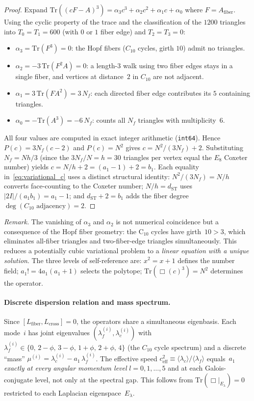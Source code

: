 \documentclass[12pt,a4paper]{article}
\theoremstyle{definition}
\begin{document}
\begin{proof}
Expand $\mathrm{Tr}((cF - A)^3) = \alpha_3 c^3 + \alpha_2 c^2 + \alpha_1 c + \alpha_0$ where $F = A_{\mathrm{fiber}}$.  Using the cyclic property of the trace and the classification of the $1200$ triangles into $T_0 = T_1 = 600$ (with $0$ or $1$ fiber edge) and $T_2 = T_3 = 0$:
\begin{itemize}
\item $\alpha_3 = \mathrm{Tr}(F^3) = 0$: the Hopf fibers ($C_{10}$ cycles, girth $10$) admit no triangles.
\item $\alpha_2 = -3\,\mathrm{Tr}(F^2 A) = 0$: a length-$3$ walk using two fiber edges stays in a single fiber, and vertices at distance~$2$ in $C_{10}$ are not adjacent.
\item $\alpha_1 = 3\,\mathrm{Tr}(F A^2) = 3\,N_f$: each directed fiber edge contributes its $5$ containing triangles.
\item $\alpha_0 = -\mathrm{Tr}(A^3) = -6\,N_f$: counts all $N_f$ triangles with multiplicity~$6$.
\end{itemize}
All four values are computed in exact integer arithmetic (\texttt{int64}).  Hence $P(c) = 3N_f(c-2)$ and $P(c) = N^2$ gives $c = N^2/(3N_f) + 2$.  Substituting $N_f = N h/3$ (since the $3N_f/N = h = 30$ triangles per vertex equal the $E_8$ Coxeter number) yields $c = N/h + 2 = (a_1 - 1) + 2 = b_1$.  Each equality in~\eqref{eq:variational_c} uses a distinct structural identity: $N^2/(3N_f) = N/h$ converts face-counting to the Coxeter number; $N/h = d_{\mathrm{ST}}$ uses $|2I|/(a_1 b_1) = a_1 - 1$; and $d_{\mathrm{ST}} + 2 = b_1$ adds the fiber degree $\deg(C_{10}\text{ adjacency}) = 2$.
\end{proof}

\noindent\textit{Remark.}  The vanishing of $\alpha_3$ and $\alpha_2$ is not numerical coincidence but a consequence of the Hopf fiber geometry: the C$_{10}$ cycles have girth~$10 > 3$, which eliminates all-fiber triangles and two-fiber-edge triangles simultaneously.  This reduces a potentially cubic variational problem to a \emph{linear equation with a unique solution}.  The three levels of self-reference are: $x^2 = x + 1$ defines the number field; $a_1! = 4a_1(a_1\!+\!1)$ selects the polytope; $\mathrm{Tr}(\Box(c)^3) = N^2$ determines the operator.

\paragraph{Discrete dispersion relation and mass spectrum.}
Since $[L_{\mathrm{fiber}}, L_{\mathrm{cross}}] = 0$, the operators share a simultaneous eigenbasis. Each mode~$i$ has joint eigenvalues $(\lambda_f^{(i)}, \lambda_c^{(i)})$ with $\lambda_f^{(i)} \in \{0,\, 2\!-\!\phi,\, 3\!-\!\phi,\, 1\!+\!\phi,\, 2\!+\!\phi,\, 4\}$ (the $C_{10}$ cycle spectrum) and a discrete ``mass'' $\mu^{(i)} = \lambda_c^{(i)} - a_1\,\lambda_f^{(i)}$.  The effective speed $c_{\mathrm{eff}}^2 \equiv \langle\lambda_c\rangle/\langle\lambda_f\rangle$ equals~$a_1$ \emph{exactly at every angular momentum level} $l = 0, 1, \ldots, 5$ and at each Galois-conjugate level, not only at the spectral gap.  This follows from $\mathrm{Tr}(\Box|_{E_\lambda}) = 0$ restricted to each Laplacian eigenspace~$E_\lambda$.
\end{document}
